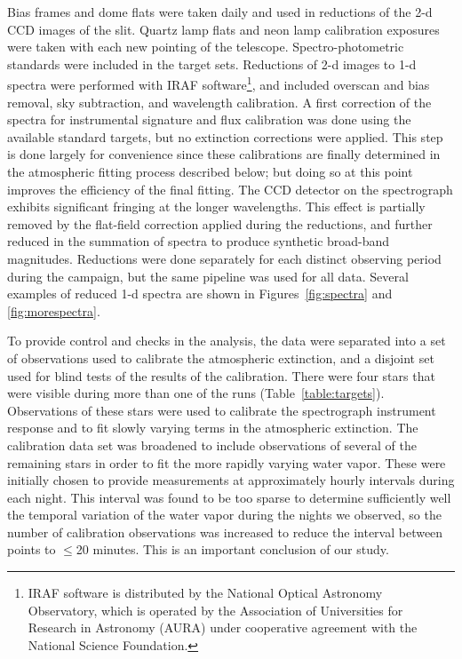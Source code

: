 \documentclass[manuscript]{aastex}
\begin{document}
Bias frames and dome flats were taken daily and used in reductions of the 2-d CCD images of the slit.
Quartz lamp flats and neon lamp calibration exposures were taken with each new pointing of the telescope.
Spectro-photometric standards were included in the target sets.
Reductions of 2-d images to 1-d spectra were performed with IRAF software\footnote{IRAF software is distributed by the
National Optical Astronomy Observatory, which is operated by the Association of Universities for Research in Astronomy (AURA)
under cooperative agreement with the National Science Foundation.},
and included overscan and bias removal, sky subtraction, and wavelength calibration. 
A first correction of the spectra for instrumental signature and flux calibration was done using the available standard targets,
but no extinction corrections were applied.
This step is done largely for convenience since these calibrations are finally determined in the atmospheric fitting process described below;
but doing so at this point improves the efficiency of the final fitting.
The CCD detector on the spectrograph exhibits significant fringing at the longer wavelengths.
This effect is partially removed by the flat-field correction applied during the reductions,
and further reduced in the summation of spectra to produce synthetic broad-band magnitudes. 
Reductions were done separately for each distinct observing period during the campaign, but the same pipeline was used for all data.
Several examples of reduced 1-d spectra are shown in Figures~\ref{fig:spectra} and \ref{fig:morespectra}.

To provide control and checks in the analysis, the data were separated into a set of observations used to calibrate the atmospheric extinction,
and a disjoint set used for blind tests of the results of the calibration.
There were four stars that were visible during more than one of the runs (Table~\ref{table:targets}). 
Observations of these stars were used to calibrate the spectrograph instrument response and to fit slowly varying terms in the atmospheric extinction.
The calibration data set was broadened to include observations of several of the remaining stars in order to fit the more rapidly varying 
water vapor. 
These were initially chosen to provide measurements at approximately hourly intervals during each night.
This interval was found to be too sparse to determine sufficiently well the temporal variation of the water vapor during the nights we observed,
so the number of calibration observations was increased to reduce the interval between points to $\le$20 minutes.
This is an important conclusion of our study.
\end{document}
